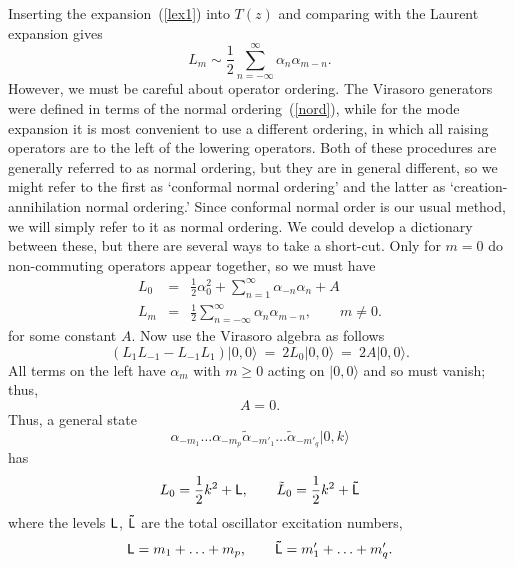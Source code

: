 Inserting the expansion~(\ref{lex1}) into $T(z)$ and comparing
with the Laurent expansion gives
\begin{equation}
L_m \sim \frac{1}{2} \sum_{n=-\infty}^\infty \alpha_n \alpha_{m-n}.
\end{equation}
However, we must be careful about operator ordering.  The Virasoro
generators were defined in terms of the normal
ordering~(\ref{nord}), while for the mode expansion it is most
convenient to use a different ordering, in which all raising
operators are to the left of the lowering operators.  Both of
these procedures are generally referred to as normal ordering, but
they are in general different, so we might refer to the first as
`conformal normal ordering' and the latter as
`creation-annihilation normal ordering.'  Since conformal normal
order is our usual method, we will simply refer to it as
normal ordering.
We could develop a dictionary between these, but there are
several ways to take a short-cut.  Only for $m = 0$ do
non-commuting operators appear together, so we must have
\begin{eqnarray}
L_0 &=& \frac{1}{2} \alpha_0^2 + \sum_{n = 1}^\infty
\alpha_{-n} \alpha_{n} + A \nonumber\\
L_m &=& \frac{1}{2} \sum_{n=-\infty}^\infty \alpha_n \alpha_{m-n},
\qquad m \neq 0.
\end{eqnarray}
for some constant $A$.  Now use the Virasoro algebra as follows
\begin{equation}
(L_1 L_{-1} - L_{-1} L_1) |0,0\rangle\ =\ 2 L_0 |0,0\rangle
\ =\ 2A|0,0\rangle. \label{nocon}
\end{equation}
All terms on the left have $\alpha_m$ with $m \geq 0$ acting on
$|0,0\rangle$ and so must vanish; thus,
\begin{equation}
A = 0.
\end{equation}
Thus, a general state
\begin{equation}
\alpha_{-m_1} \ldots \alpha_{-m_p} \tilde\alpha_{-m'_1} \ldots
\tilde\alpha_{-m'_q} |0,k\rangle
\end{equation}
has
\begin{equation}
L_0 = \frac{1}{2} k^2 + {\sf L}, \qquad \tilde L_0 = \frac{1}{2}
k^2 + {\sf \tilde L}
\end{equation}
where the levels ${\sf L}$, ${\sf \tilde L}$ are the total oscillator
excitation numbers,
\begin{equation}
{\sf L} = m_1 + \ldots + m_p, \qquad 
{\sf \tilde L} = m'_1 + \ldots + m'_q. \label{level}
\end{equation}

